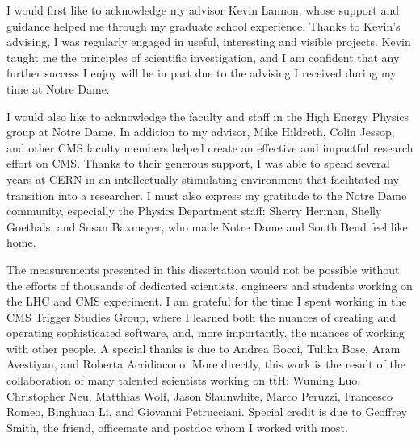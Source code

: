 \documentclass[final,numrefs,sort&compress,noinfo]{nddiss2e}
\newcommand{\tth}{\ensuremath{\mathrm{t}\overline{\mathrm{t}}\mathrm{H}}\xspace}
\begin{document}
\begin{acknowledge}
I would first like to acknowledge my advisor Kevin Lannon, whose support and guidance helped me through my graduate school experience.
Thanks to Kevin's advising, I was regularly engaged in useful, interesting and visible projects.
Kevin taught me the principles of scientific investigation, and I am confident that any further success I enjoy will be in part
due to the advising I received during my time at Notre Dame.

I would also like to acknowledge the faculty and staff in the High Energy Physics group at Notre Dame. In addition to my advisor,
Mike Hildreth, Colin Jessop, and other CMS faculty members helped create an effective and impactful research effort on CMS.
Thanks to their generous support, I was able to spend several years at CERN in an intellectually
stimulating environment that facilitated my transition into a researcher. 
I must also express my gratitude to the Notre Dame community,
especially the Physics Department staff: Sherry Herman, Shelly Goethals, and Susan Baxmeyer, who made Notre Dame and South Bend
feel like home. 

The measurements presented in this dissertation would not be possible without the efforts of thousands
of dedicated scientists, engineers and students working on the LHC and CMS experiment. 
I am grateful for the time I spent working in the CMS Trigger Studies Group,
where I learned both the nuances of creating and operating sophisticated software, and, more importantly, the nuances of working with other people.
A special thanks is due to Andrea Bocci, Tulika Bose, Aram Avestiyan, and Roberta Acridiacono.
More directly, this work is the result of the collaboration of many talented scientists working on \tth:
Wuming Luo, Christopher Neu, Matthias Wolf, Jason Slaunwhite, Marco Peruzzi, Francesco Romeo, Binghuan Li, and Giovanni Petrucciani. 
Special credit is due to Geoffrey Smith, the friend, officemate and postdoc whom I worked with most. 


\end{acknowledge}
\end{document}
